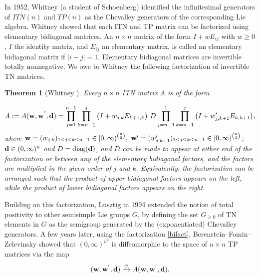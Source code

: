 \documentclass[11pt,reqno]{amsart}
\theoremstyle{plain}
\newtheorem{theorem}{Theorem}[section]
\newcommand{\El}{\mathrm{E}}
\theoremstyle{definition}
\numberwithin{equation}{section}
\DeclareMathOperator{\diag}{diag}
\begin{document}
In 1952, Whitney \cite{Whitney} (a student of Schoenberg)  identified the infinitesimal generators of $ITN(n)$ and $TP(n)$ as the Chevalley generators of the corresponding Lie algebra. Whitney showed that  each ITN and TP matrix can be factorized using elementary bidiagonal matrices.  An $n\times n$ matrix of the form $I+w E_{ij}$ with $w \geq 0$, $I$ the identity matrix, and $E_{ij}$ an elementary matrix, is called an elementary bidiagonal matrix if $|i-j| = 1$. Elementary bidiagonal matrices are invertible totally nonnegative. We owe to Whitney the following factorization of invertible TN matrices.

\begin{theorem}[Whitney \cite{Whitney}]
	Every $n \times n$ ITN matrix $A$ is of the form
	
	\begin{equation}\label{bifact}
		A:=A({\bf w, w^{'}, d})=\prod_{j=1}^{n-1} \prod_{k=n-1}^{j} \big{(} I+w_{j,k}E_{k+1,k} \big{)}~D \prod_{j=n-1}^{1} \prod_{k=n-1}^{j} \big{(} I+ w'_{j,k+1}E_{k,k+1} \big{)},
	\end{equation}
	where  ${\bf w}=(w_{j,k})_{1 \leq j \leq k \leq n-1} \in [0,\infty)^{ n \choose 2},~ {\bf w'}=(w'_{j,k+1})_{1\leq j\leq k\leq n-1} \in [0,\infty)^{ n \choose 2}$; ${\bf d } \in \mathbb  (0,\infty)^n$ and $D=\diag({\bf d })$, and $D$ can be made to appear at either end of the factorization or between any of the elementary bidiagonal factors, and the factors are multiplied in the given order of $j$ and $k.$  Equivalently, the factorization can be arranged such that the product of upper bidiagonal factors appears on the left, while the product of lower bidiagonal factors appears on the right.
\end{theorem}

Building on this factorization, Lusztig \cite{Lu94} in 1994 extended the notion of total positivity to other semisimple Lie groups $G$, by defining the set $G_{\geq 0}$ of TN elements in $G$ as the semigroup generated by the (exponentiated) Chevalley generators. A few years later, using the factorization \eqref{bifact}, Berenstein--Fomin--Zelevinsky \cite{BFZ96} showed that $(0,\infty)^{n^2}$ is diffeomorphic to the space of $n\times n$ TP matrices via the map %
\[({\bf w, w^{'}, d})\xrightarrow{\psi} A({\bf w, w^{'}, d}).\]\smallskip
\end{document}
